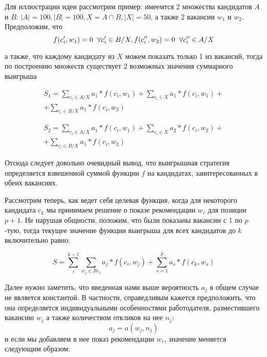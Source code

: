 \documentclass[twocolumn]{article}
\begin{document}
    Для иллюстрации идеи рассмотрим пример: имеемтся 2 множества кандидатов $A$ и $B$: $|A| = 100, |B| = 100, X = A \cap B, |X| = 50$, а также 2 вакансии $w_1$ и $w_2$. Предположим, что
    \begin{equation}
        \label{intro_example}
        f(c'_{i}, w_1) = 0 \hspace{2mm}  \forall{c'_i} \in B/X,
        f(c''_{i}, w_2) = 0 \hspace{2mm}  \forall{c''_i} \in A/X
    \end{equation}

    а также, что каждому кандидату из $X$  можем показать только 1 из вакансий, тогда по построению множеств существует 2 возможных значения суммарного выигрыша

    \begin{multline*}
        S_1 = \sum_{c_i \in A / X} a_1 * f(c_i, w_1) + \sum_{c_i \in X} a_1 * f(c_i, w_1) + \\
        + \sum_{c_i \in B / X} a_1 * f(c_i, w_2)
    \end{multline*}

    \begin{multline*}
        S_2 = \sum_{c_i \in A / X} a_1 * f(c_i, w_1) + \sum_{c_i \in X} a_2 * f(c_i, w_2) + \\
        + \sum_{c_i \in B / X} a_1 * f(c_i, w_2)
    \end{multline*}

    Отсюда следует довольно очевидный вывод, что выигрышная стратегия определяется взвешенной суммой функции $f$ на кандидатах, заинтересованных в обеих вакансиях.

    Рассмотрим теперь, как ведет себя целевая функция, когда для некоторого кандидата $c_k$ мы принимаем решение о показе рекомендации $w_r$ для позиции $p + 1$. Не нарушая общности, положим, что были показаны вакансии с 1 по $p$-тую, тогда текущее значение функции выигрыша для всех кандидатов до $k$ включительно равно:

    $$
    S = \sum_{i}^{k-1}\sum_{w_j \in Re_{i}} a_{j}  * f(c_i, w_j) + \sum_{s = 1}^{p} a_{s}  * f(c_k, w_s)
    $$

    Далее нужно заметить, что введенная нами выше вероятность $a_j$ в общем случае не является константой. В частности, справедливым кажется предположить, что она определяется индивидуальными особенностями работодателя, разместившего вакансию $w_j$ а также количеством откликов на нее $n_j$:
    \begin{equation}
        \label{a_def}
        a_j = a(w_j, n_j)
    \end{equation}
    и если мы добавляем в нее показ рекомендации $w_r$, значение меняется следующим образом:
\end{document}
